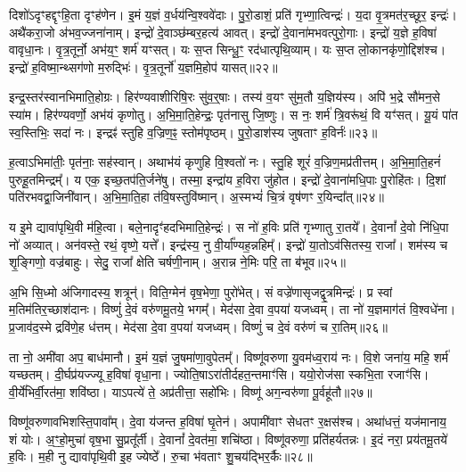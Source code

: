 दिशो॑\-ऽदृꣳहद्दृꣳहि॒ता दृꣳह॑णेन।
इ॒मं य॒ज्ञं व॒र्धय॑न्वि॒श्व\-वे॑दाः।
पु॒रो॒डाशं॒ प्रति॑ गृभ्णा॒त्विन्द्रः॑।
य॒दा वृ॒त्रमत॑र॒च्छूर॒ इन्द्रः॑।
अथै॑करा॒जो अ॑भव॒ज्जना॑नाम्।
इन्द्रो॑ दे॒वाञ्छ॑म्बर॒हत्य॑ आवत्।
इन्द्रो॑ दे॒वाना॑मभवत्पुरो॒गाः।
इन्द्रो॑ य॒ज्ञे ह॒विषा॑ वावृधा॒नः।
वृ॒त्र॒तूर्नो॒ अभ॑य॒ꣳ॒ शर्म॑ यꣳसत्।
यः स॒प्त सिन्धू॒ꣳ॒ रद॑धात्पृथि॒व्याम्।
यः स॒प्त लो॒कानकृ॑णो॒द्दिश॑श्च।
इन्द्रो॑ ह॒विष्मा॒न्थ्सग॑णो म॒रुद्भिः॑।
वृ॒त्र॒तूर्नो॑ य॒ज्ञमि॒होप॑ यासत्॥२२॥\anuvakamend[व॒व॒र्थ॒ वि॒थ्स॒ इन्द्र॑स्तु॒राया᳚स्तु वृत्र॒तूर्ये॒ वज्र॑बाहुः पृथि॒व्यान्त्रीणि॑ च]

इन्द्र॒स्तर॑स्वानभिमाति॒होग्रः।
हिर॑ण्यवाशीरिषि॒रः सु॑व॒र्॒षाः।
तस्य॑ व॒यꣳ सु॑म॒तौ य॒ज्ञिय॑स्य।
अपि॑ भ॒द्रे सौ॑मन॒से स्या॑म।
हिर॑ण्यवर्णो॒ अभ॑यं कृणोतु।
अ॒भि॒मा॒ति॒हेन्द्रः॒ पृत॑नासु जि॒ष्णुः।
स नः॒ शर्म॑ त्रि॒वरू॑थं॒ वि यꣳ॑सत्।
यू॒यं पा॑त स्व॒स्तिभिः॒ सदा॑ नः।
इन्द्रꣴ॑ स्तुहि व॒ज्रिण॒ꣴ॒ स्तोम॑पृष्ठम्।
पु॒रो॒डाश॑स्य जुषताꣳ ह॒विर्नः॑॥२३॥

ह॒त्वाऽभिमा॑तीः॒ पृत॑नाः॒ सह॑स्वान्।
अथाभ॑यं कृणुहि वि॒श्वतो॑ नः।
स्तु॒हि शूरं॑ व॒ज्रिण॒मप्र॑तीत्तम्।
अ॒भि॒मा॒ति॒हनं॑ पुरुहू॒तमिन्द्रम्᳚।
य एक॒ इच्छ॒तप॑ति॒र्जने॑षु।
तस्मा॒ इन्द्रा॑य ह॒विरा जु॑होत।
इन्द्रो॑ दे॒वाना॑मधि॒पाः पु॒रोहि॑तः।
दि॒शां पति॑रभवद्वा॒जिनी॑वान्।
अ॒भि॒मा॒ति॒हा त॑वि॒षस्तुवि॑ष्मान्।
अ॒स्मभ्यं॑ चि॒त्रं वृष॑णꣳ र॒यिन्दा᳚त्॥२४॥

य इ॒मे द्यावा॑पृथि॒वी म॑हि॒त्वा।
बले॒नादृꣳ॑हदभिमाति॒हेन्द्रः॑।
स नो॑ ह॒विः प्रति॑ गृभ्णातु रा॒तये᳚।
दे॒वानां᳚ दे॒वो नि॑धि॒पा नो॑ अव्यात्।
अन॑वस्ते॒ रथं॒ वृष्णे॒ यत्ते᳚।
इन्द्र॑स्य॒ नु वी॒र्या᳚ण्यह॒न्नहिम्᳚।
इन्द्रो॑ या॒तो\-ऽव॑सितस्य॒ राजा᳚।
शम॑स्य च शृ॒ङ्गिणो॒ वज्र॑बाहुः।
सेदु॒ राजा᳚ क्षेति चर्\mbox{}षणी॒नाम्।
अ॒रान्न ने॒मिः परि॒ ता ब॑भूव॥२५॥

अ॒भि सि॒ध्मो अ॑जिगादस्य॒ शत्रून्॑।
विति॒ग्मेन॑ वृष॒भेणा॒ पुरो॑भेत्।
सं वज्रे॑णासृजद्वृ॒त्रमिन्द्रः॑।
प्र स्वां म॒तिम॑तिर॒च्छाश॑दानः।
विष्णुं॑ दे॒वं वरु॑णमू॒तये॒ भगम्᳚।
मेद॑सा दे॒वा व॒पया॑ यजध्वम्।
ता नो॑ य॒ज्ञमाग॑तं वि॒श्वधे॑ना।
प्र॒जाव॑द॒स्मे द्रवि॑णे॒ह ध॑त्तम्।
मेद॑सा दे॒वा व॒पया॑ यजध्वम्।
विष्णुं॑ च दे॒वं वरु॑णं च रा॒तिम्॥२६॥

ता नो॒ अमी॑वा अप॒ बाध॑मानौ।
इ॒मं य॒ज्ञं जु॒षमा॑णा॒वुपेतम्᳚।
विष्णू॑वरुणा यु॒वम॑ध्व॒राय॑ नः।
वि॒शे जना॑य॒ महि॒ शर्म॑ यच्छतम्।
दी॒र्घप्र॑यज्ज्यू ह॒विषा॑ वृधा॒ना।
ज्योति॒षा\-ऽरा॑तीर्दह\-त॒न्तमाꣳ॑सि।
ययो॒रोज॑सा स्कभि॒ता रजाꣳ॑सि।
वी॒र्ये॑भिर्वी॒रत॑मा॒ शवि॑ष्ठा।
याऽपत्ये॑ ते॒ अप्र॑तीत्ता॒ सहो॑भिः।
विष्णू॑ अग॒न्वरु॑णा पू॒र्वहू॑तौ॥२७॥

विष्णू॑वरुणावभिशस्ति॒पावा᳚म्।
दे॒वा य॑जन्त ह॒विषा॑ घृ॒तेन॑।
अपामी॑वाꣳ सेधतꣳ र॒क्षस॑श्च।
अथा॑धत्तं॒ यज॑मानाय॒ शं योः।
अ॒ꣳ॒हो॒मुचा॑ वृष॒भा सु॒प्रतू᳚र्ती।
दे॒वानां᳚ दे॒वत॑मा॒ शचि॑ष्ठा।
विष्णू॑वरुणा॒ प्रति॑\-हर्यतन्नः।
इ॒दं नरा॒ प्रय॑तमू॒तये॑ ह॒विः।
म॒ही नु द्यावा॑पृथि॒वी इ॒ह ज्येष्ठे᳚।
रु॒चा भ॑वताꣳ शु॒चय॑द्भिर॒र्कैः॥२८॥

